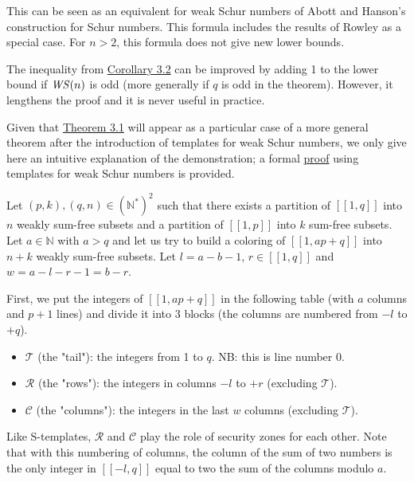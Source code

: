 This can be seen as an equivalent for weak Schur numbers of Abott and Hanson's construction for Schur numbers. This formula includes
the results of Rowley \cite{RowleyWS} as a special case. For \(n>2\), this formula does not give new lower bounds.

\begin{remark}
The inequality from \hyperref[Corollary3.2]{Corollary 3.2} can be improved by adding 1 to the lower bound if \(\mathit{WS} (n)\) is odd (more generally if \(q\) is
odd in the theorem). However, it lengthens the proof and it is never useful in practice.
\end{remark}

Given that \hyperref[Theorem3.1]{Theorem 3.1} will appear as a particular case of a more general theorem after the introduction of
templates for weak Schur numbers, we only give here an intuitive explanation of the demonstration; a formal
\hyperref[PreuveThm]{proof} using templates for weak Schur numbers is provided.

Let \((p, k), (q, n) \in (\mathbb{N}^*)^2\) such that there exists a partition of \([\![1,q]\!]\) into \(n\) weakly sum-free
subsets and a partition of \([\![1,p]\!]\) into \(k\) sum-free subsets. Let \(a \in \mathbb{N}\) with \(a > q\)
and let us try to build a coloring of \([\![1, ap + q]\!]\) into \(n + k\) weakly sum-free subsets. Let
\(l = a - b - 1\), \(r \in [\![1,q]\!]\) and \(w = a - l - r - 1 = b - r\).

First, we put the integers of \([\![1, ap + q]\!]\) in the following table (with \(a\) columns and \(p + 1\) lines)
and divide it into 3 blocks (the columns are numbered from \(-l\) to \(+q\)).

\begin{itemize}
	\item \(\mathcal{T}\) (the "tail"): the integers from 1 to \(q\). NB: this is line number 0.
	\item \(\mathcal{R}\) (the "rows"): the integers in columns \(-l\) to \(+r\) (excluding  \(\mathcal{T}\)).
	\item \(\mathcal{C}\) (the "columns"): the integers in the last \(w\) columns (excluding  \(\mathcal{T}\)).
\end{itemize}

Like S-templates, \(\mathcal{R}\) and \(\mathcal{C}\) play the role of security zones for each other. Note that with
this numbering of columns, the column of the sum of two numbers is the only integer in \([\![-l,q]\!]\) equal to two the
sum of the columns modulo \(a\).

